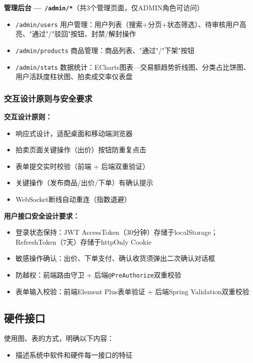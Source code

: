 \documentclass[12pt,a4paper]{ctexart}
\numberwithin{figure}{section}
\numberwithin{table}{section}
\begin{document}
\textbf{管理后台 --- \texttt{/admin/*}}（共3个管理页面，仅ADMIN角色可访问）

\begin{itemize}
    \item \texttt{/admin/users} 用户管理：用户列表（搜索+分页+状态筛选）、待审核用户高亮、"通过"/"驳回"按钮、封禁/解封操作
    \item \texttt{/admin/products} 商品管理：商品列表、"通过"/"下架"按钮
    \item \texttt{/admin/stats} 数据统计：ECharts图表---交易额趋势折线图、分类占比饼图、用户活跃度柱状图、拍卖成交率仪表盘
\end{itemize}

\subsubsection{交互设计原则与安全要求}

\textbf{交互设计原则：}
\begin{itemize}
    \item 响应式设计，适配桌面和移动端浏览器
    \item 拍卖页面关键操作（出价）按钮防重复点击
    \item 表单提交实时校验（前端 + 后端双重验证）
    \item 关键操作（发布商品/出价/下单）有确认提示
    \item WebSocket断线自动重连（指数退避）
\end{itemize}

\textbf{用户接口安全设计要求：}
\begin{itemize}
    \item 登录状态保持：JWT AccessToken（30分钟）存储于localStorage；RefreshToken（7天）存储于httpOnly Cookie
    \item 敏感操作确认：出价、下单支付、确认收货须弹出二次确认对话框
    \item 防越权：前端路由守卫 + 后端\verb|@PreAuthorize|双重校验
    \item 表单输入校验：前端Element Plus表单验证 + 后端Spring Validation双重校验
\end{itemize}

\subsection{硬件接口}

使用图、表的方式，明确以下内容：

\begin{itemize}
    \item 描述系统中软件和硬件每一接口的特征
\end{itemize}
\end{document}
